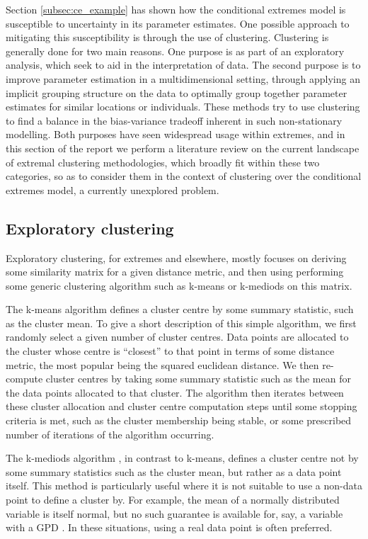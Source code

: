 \documentclass{article}
\numberwithin{equation}{section}
\begin{document}
Section \ref{subsec:ce_example} has shown how the conditional extremes model is susceptible to uncertainty in its parameter estimates. 
One possible approach to mitigating this susceptibility is through the use of clustering. 
Clustering is generally done for two main reasons.
One purpose is as part of an exploratory analysis, which seek to aid in the interpretation of data. 
The second purpose is to improve parameter estimation in a multidimensional setting, through applying an implicit grouping structure on the data to optimally group together parameter estimates for similar locations or individuals. 
These methods try to use clustering to find a balance in the bias-variance tradeoff inherent in such non-stationary modelling. 
Both purposes have seen widespread usage within extremes, and in this section of the report we perform a literature review on the current landscape of extremal clustering methodologies, which broadly fit within these two categories, so as to consider them in the context of clustering over the conditional extremes model, a currently unexplored problem.

\subsection{Exploratory clustering}

Exploratory clustering, for extremes and elsewhere, mostly focuses on deriving some similarity matrix for a given distance metric, and then using performing some generic clustering algorithm such as k-means or k-mediods on this matrix.

The k-means algorithm \citep{Macqueen1967} defines a cluster centre by some summary statistic, such as the cluster mean.
To give a short description of this simple algorithm, we first randomly select a given number of cluster centres.
Data points are allocated to the cluster whose centre is ``closest'' to that point in terms of some distance metric, the most popular being the squared euclidean distance.
We then re-compute cluster centres by taking some summary statistic such as the mean for the data points allocated to that cluster.
The algorithm then iterates between these cluster allocation and cluster centre computation steps until some stopping criteria is met, such as the cluster membership being stable, or some prescribed number of iterations of the algorithm occurring.

The k-mediods algorithm \citep{Kaufman1987}, in contrast to k-means, defines a cluster centre not by some summary statistics such as the cluster mean, but rather as a data point itself.
This method is particularly useful where it is not suitable to use a non-data point to define a cluster by. 
For example, the mean of a normally distributed variable is itself normal, but no such guarantee is available for, say, a variable with a GPD \citep{Vignotto2021}.
In these situations, using a real data point is often preferred.
\end{document}
